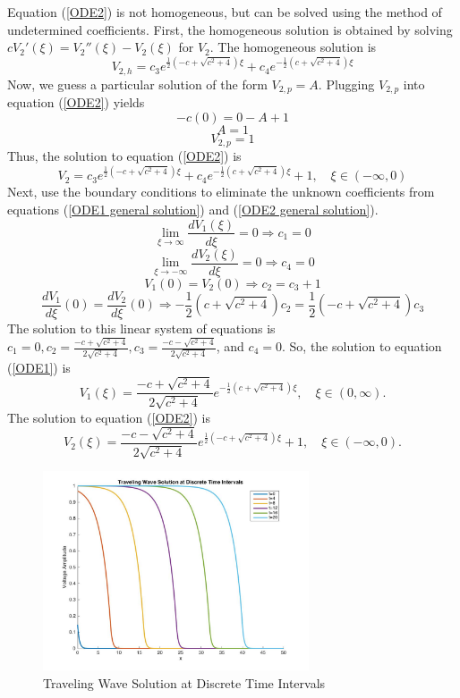 \documentclass[12pt]{article}
\begin{document}
Equation (\ref{ODE2}) is not homogeneous, but can be solved using the method of undetermined coefficients. First, the homogeneous solution is obtained by solving $cV_2'(\xi)=V_2''(\xi)-V_2(\xi)$ for $V_2$. The homogeneous solution is
$$V_{2,h}=c_3 e^{\frac{1}{2}(-c+\sqrt{c^2+4})\xi}+c_4 e^{-\frac{1}{2}(c+\sqrt{c^2+4})\xi}$$
Now, we guess a particular solution of the form $V_{2,p}=A$. Plugging $V_{2,p}$ into equation (\ref{ODE2}) yields 
$$-c(0)=0-A+1$$
$$A=1$$ 
$$V_{2,p}=1$$
Thus, the solution to equation (\ref{ODE2}) is 
\begin{equation}
\label{ODE2 general solution}
V_{2}=c_3 e^{\frac{1}{2}(-c+\sqrt{c^2+4})\xi}+c_4 e^{-\frac{1}{2}(c+\sqrt{c^2+4})\xi}+1, \quad \xi \in (-\infty,0)
\end{equation}
Next, use the boundary conditions to eliminate the unknown coefficients from equations (\ref{ODE1 general solution}) and (\ref{ODE2 general solution}). 
$$\lim_{\xi\to\infty} \frac{d V_1(\xi)}{d \xi}=0\Rightarrow c_1=0$$
$$\lim_{\xi\to-\infty} \frac{d V_2(\xi)}{d \xi}=0\Rightarrow c_4=0$$
$$V_1(0)=V_2(0)\Rightarrow c_2=c_3+1$$
$$\frac{d V_1}{d \xi}(0)=\frac{d V_2}{d \xi}(0)\Rightarrow -\frac{1}{2}(c+\sqrt{c^2+4}) c_2= \frac{1}{2}(-c+\sqrt{c^2+4})c_3$$ 
The solution to this linear system of equations is $c_1=0, c_2=\frac{-c+\sqrt{c^2+4}}{2\sqrt{c^2+4}}, c_3=\frac{-c-\sqrt{c^2+4}}{2\sqrt{c^2+4}}$, and $c_4=0$. So, the solution to equation (\ref{ODE1}) is 
\begin{equation}
\label{ODE1 solution}
V_1(\xi)=\frac{-c+\sqrt{c^2+4}}{2\sqrt{c^2+4}}e^{-\frac{1}{2}(c+\sqrt{c^2+4})\xi},\quad \xi \in (0,\infty).
\end{equation}
The solution to equation (\ref{ODE2}) is
\begin{equation}
\label{ODE2 solution}
V_2(\xi)=\frac{-c-\sqrt{c^2+4}}{2\sqrt{c^2+4}}e^{\frac{1}{2}(-c+\sqrt{c^2+4})\xi}+1,\quad \xi \in (-\infty,0).
\end{equation}
\begin{figure}[H]
\centering
\includegraphics[width=0.7\textwidth]{waveThang.jpg}
\caption{Traveling Wave Solution at Discrete Time Intervals}
\label{kahkaw}
\end{figure}
\end{document}
